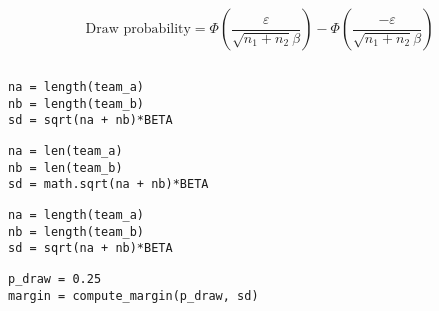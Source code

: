 \documentclass[article]{jss}
\newif\ifen
\newif\ifes
\newcommand{\en}[1]{\ifen#1\fi}
\newcommand{\es}[1]{\ifes#1\fi}
\begin{document}
%
\en{Since the observed results are independent of our beliefs, the only source of uncertainty comes from the variance of individual perfomances $\beta$.}
\es{Como los resultados observados son independientes de nuestras creencias, la \'unica fuente de incertidumbre proviene de varianza de los rendimientos $\beta$.}
%
\en{This is how we can define an equation that links the margin with the probability of a tie.}
\es{As\'i es que podemos definir una ecuaci\'on que vincula el margen con la probabilidades de empate.}
%
\begin{equation}
 \text{Draw probability} = \Phi(\frac{\varepsilon}{\sqrt{n_1+n_2}\beta}) - \Phi(\frac{-\varepsilon}{\sqrt{n_1+n_2}\beta})
\end{equation}
%
\begin{lstlisting}[backgroundcolor=\color
{white},label=lst:draw, caption=\relax, belowskip=-1.0 \baselineskip, aboveskip=-0 \baselineskip]
\end{lstlisting}
\begin{paracol}{3}
\begin{lstlisting}[backgroundcolor=\color{julia},belowskip=-0.77 \baselineskip]
na = length(team_a)
nb = length(team_b)
sd = sqrt(na + nb)*BETA
\end{lstlisting}
\switchcolumn
\begin{lstlisting}[backgroundcolor=\color{python},belowskip=-0.77 \baselineskip]
na = len(team_a)
nb = len(team_b)
sd = math.sqrt(na + nb)*BETA
\end{lstlisting}
\switchcolumn
\begin{lstlisting}[backgroundcolor=\color{r},belowskip=-0.77 \baselineskip]
na = length(team_a)
nb = length(team_b)
sd = sqrt(na + nb)*BETA
\end{lstlisting}
\end{paracol}
\begin{lstlisting}[backgroundcolor=\color{all}]
p_draw = 0.25
margin = compute_margin(p_draw, sd)
\end{lstlisting}  
%
%
\subsection{\en{Optimal approximation of the exact posterior}} \label{sec:approximate_posterior}
\end{document}
